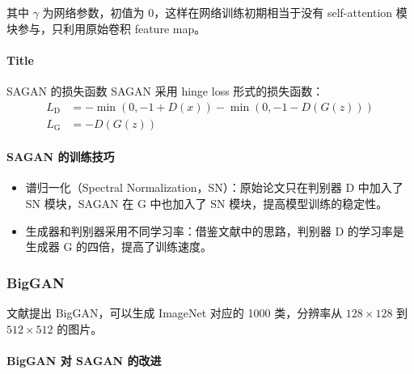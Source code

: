 其中 $\gamma$ 为网络参数，初值为 0，这样在网络训练初期相当于没有 self-attention
模块参与，只利用原始卷积 feature map。

\paragraph{Title}{SAGAN 的损失函数}
SAGAN 采用 hinge loss 形式的损失函数：
\begin{align}
  L_{\mathrm{D}} & = -\min \left( 0, -1 + D(x) \right) - \min \left( 0, -1-D(G(z)) \right) \\
  L_{\mathrm{G}} & = -D(G(z))
\end{align}

\paragraph{SAGAN 的训练技巧}
\begin{itemize}
  \item 谱归一化（Spectral Normalization，SN）：原始论文只在判别器 D 中加入了 SN
    模块，SAGAN 在 G 中也加入了 SN 模块，提高模型训练的稳定性。
  \item 生成器和判别器采用不同学习率：借鉴文献中的思路，判别器
    D 的学习率是生成器 G 的四倍，提高了训练速度。
\end{itemize}

\subsubsection{BigGAN}
文献提出 BigGAN，可以生成 ImageNet 对应的 1000 类，分辨率从
$128 \times 128$ 到 $512 \times 512$ 的图片。

\paragraph{BigGAN 对 SAGAN 的改进}

